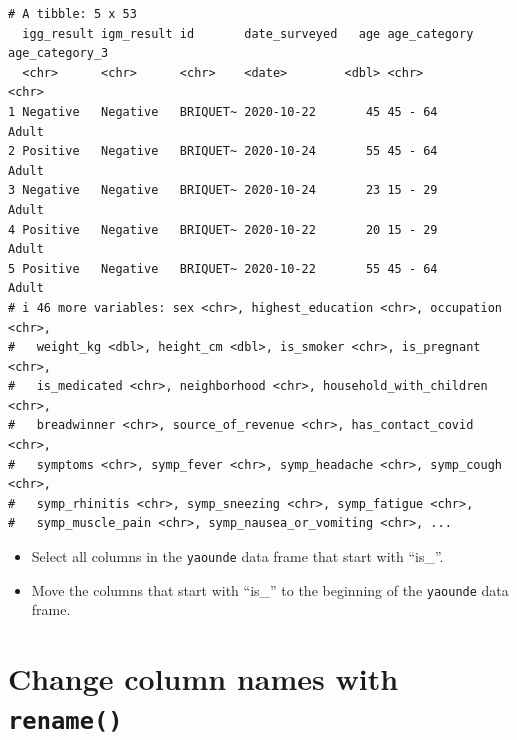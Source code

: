 \documentclass[
  letterpaper,
  DIV=11,
  numbers=noendperiod]{scrreprt}
\providecommand{\tightlist}{%
  \setlength{\itemsep}{0pt}\setlength{\parskip}{0pt}}\usepackage{longtable,booktabs,array}
\begin{document}
\begin{verbatim}
# A tibble: 5 x 53
  igg_result igm_result id       date_surveyed   age age_category age_category_3
  <chr>      <chr>      <chr>    <date>        <dbl> <chr>        <chr>         
1 Negative   Negative   BRIQUET~ 2020-10-22       45 45 - 64      Adult         
2 Positive   Negative   BRIQUET~ 2020-10-24       55 45 - 64      Adult         
3 Negative   Negative   BRIQUET~ 2020-10-24       23 15 - 29      Adult         
4 Positive   Negative   BRIQUET~ 2020-10-22       20 15 - 29      Adult         
5 Positive   Negative   BRIQUET~ 2020-10-22       55 45 - 64      Adult         
# i 46 more variables: sex <chr>, highest_education <chr>, occupation <chr>,
#   weight_kg <dbl>, height_cm <dbl>, is_smoker <chr>, is_pregnant <chr>,
#   is_medicated <chr>, neighborhood <chr>, household_with_children <chr>,
#   breadwinner <chr>, source_of_revenue <chr>, has_contact_covid <chr>,
#   symptoms <chr>, symp_fever <chr>, symp_headache <chr>, symp_cough <chr>,
#   symp_rhinitis <chr>, symp_sneezing <chr>, symp_fatigue <chr>,
#   symp_muscle_pain <chr>, symp_nausea_or_vomiting <chr>, ...
\end{verbatim}

\begin{tcolorbox}[enhanced jigsaw, colframe=quarto-callout-tip-color-frame, rightrule=.15mm, opacityback=0, breakable, coltitle=black, colbacktitle=quarto-callout-tip-color!10!white, bottomrule=.15mm, leftrule=.75mm, toprule=.15mm, arc=.35mm, bottomtitle=1mm, colback=white, left=2mm, opacitybacktitle=0.6, titlerule=0mm, title=\textcolor{quarto-callout-tip-color}{\faLightbulb}\hspace{0.5em}{Practice}, toptitle=1mm]

\begin{itemize}
\tightlist
\item
  Select all columns in the \texttt{yaounde} data frame that start with
  ``is\_''.
\end{itemize}

\begin{itemize}
\tightlist
\item
  Move the columns that start with ``is\_'' to the beginning of the
  \texttt{yaounde} data frame.
\end{itemize}

\end{tcolorbox}

\hypertarget{change-column-names-with-rename}{%
\section{\texorpdfstring{Change column names with
\texttt{rename()}}{Change column names with rename()}}\label{change-column-names-with-rename}}
\end{document}
